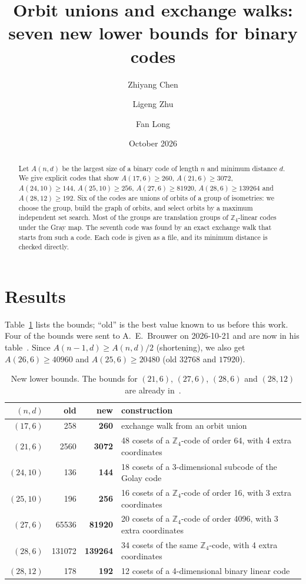 \documentclass[11pt]{article}
\title{Orbit unions and exchange walks:\\ seven new lower bounds for binary codes}
\author{Zhiyang Chen \and Ligeng Zhu \and Fan Long}
\date{October 2026}
\newcommand{\Z}{\mathbb{Z}_4}
\begin{document}
\maketitle

\begin{abstract}
Let $A(n,d)$ be the largest size of a binary code of length $n$ and minimum distance $d$. We give explicit codes
that show $A(17,6)\ge260$, $A(21,6)\ge3072$, $A(24,10)\ge144$, $A(25,10)\ge256$, $A(27,6)\ge81920$,
$A(28,6)\ge139264$ and $A(28,12)\ge192$. Six of the codes are unions of orbits of a group of isometries: we choose
the group, build the graph of orbits, and select orbits by a maximum independent set search. Most of the groups
are translation groups of $\Z$-linear codes under the Gray map. The seventh code was found by an exact exchange walk
that starts from such a code. Each code is given as a file, and its minimum distance is checked directly.
\end{abstract}

\section{Results}

Table~\ref{tab:results} lists the bounds; ``old'' is the best value known to us before this work. Four of the bounds
were sent to A.~E.~Brouwer on 2026-10-21 and are now in his table~\cite{Br}. Since $A(n-1,d)\ge A(n,d)/2$
(shortening), we also get $A(26,6)\ge40960$ and $A(25,6)\ge20480$ (old $32768$ and $17920$).

\begin{table}[ht]
\centering
\begin{tabular}{rrrl}
\toprule
$(n,d)$ & old & new & construction \\
\midrule
$(17,6)$ & 258 \cite{Mil} & \textbf{260} & exchange walk from an orbit union \\
$(21,6)$ & 2560 & \textbf{3072} & 48 cosets of a $\Z$-code of order 64, with 4 extra coordinates \\
$(24,10)$ & 136 \cite{LO} & \textbf{144} & 18 cosets of a 3-dimensional subcode of the Golay code \\
$(25,10)$ & 196 \cite{OOH} & \textbf{256} & 16 cosets of a $\Z$-code of order 16, with 3 extra coordinates \\
$(27,6)$ & 65536 & \textbf{81920} & 20 cosets of a $\Z$-code of order 4096, with 3 extra coordinates \\
$(28,6)$ & 131072 & \textbf{139264} & 34 cosets of the same $\Z$-code, with 4 extra coordinates \\
$(28,12)$ & 178 & \textbf{192} & 12 cosets of a 4-dimensional binary linear code \\
\bottomrule
\end{tabular}
\caption{New lower bounds. The bounds for $(21,6)$, $(27,6)$, $(28,6)$ and $(28,12)$ are already in~\cite{Br}.}
\label{tab:results}
\end{table}
\end{document}
